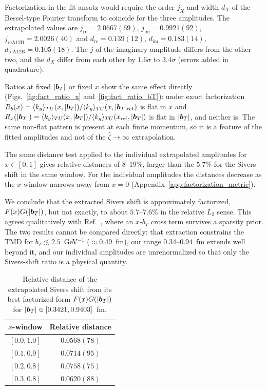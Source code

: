 Factorization in the fit ansatz would require the order $j_X$ and width $d_X$ of the Bessel-type Fourier transform to coincide for the three amplitudes. The extrapolated values are $j_{\text{re}}=2.0667(69)$, $j_{\text{im}}=0.9921(92)$, $j_{\text{reA12B}}=2.0026(40)$ and $d_{\text{re}}=0.139(12)$, $d_{\text{im}}=0.183(14)$, $d_{\text{reA12B}}=0.105(18)$. The $j$ of the imaginary amplitude differs from the other two, and the $d_X$ differ from each other by $1.6\sigma$ to $3.4\sigma$ (errors added in quadrature).

Ratios at fixed $|\boldsymbol{b}_T|$ or fixed $x$ show the same effect directly (Figs.~\ref{fig:fact_ratio_x} and~\ref{fig:fact_ratio_bT}): under exact factorization $R_b(x)=\langle k_y\rangle_{TU}(x,|\boldsymbol{b}_T|)/\langle k_y\rangle_{TU}(x,|\boldsymbol{b}_T|_{\rm ref})$ is flat in $x$ and $R_x(|\boldsymbol{b}_T|)=\langle k_y\rangle_{TU}(x,|\boldsymbol{b}_T|)/\langle k_y\rangle_{TU}(x_{\rm ref},|\boldsymbol{b}_T|)$ is flat in $|\boldsymbol{b}_T|$, and neither is. The same non-flat pattern is present at each finite momentum, so it is a feature of the fitted amplitudes and not of the $\hat\zeta\to\infty$ extrapolation.

The same distance test applied to the individual extrapolated amplitudes for $x\in[0,1]$ gives relative distances of $8$--$19\%$, larger than the $5.7\%$ for the Sivers shift in the same window. For the individual amplitudes the distances decrease as the $x$-window narrows away from $x=0$ (Appendix~\ref{app:factorization_metric}).

We conclude that the extracted Sivers shift is approximately factorized, $F(x)G(|\boldsymbol{b}_T|)$, but not exactly, to about $5.7$--$7.6\%$ in the relative $L_2$ sense. This agrees qualitatively with Ref.~\cite{Granger:2026symb}, where an $x$-$b_T$ cross term survives a sparsity prior. The two results cannot be compared directly: that extraction constrains the TMD for $b_T\lesssim2.5$~GeV$^{-1}$ ($\approx0.49$~fm), our range $0.34$--$0.94$~fm extends well beyond it, and our individual amplitudes are unrenormalized so that only the Sivers-shift ratio is a physical quantity.

\begin{table}
\caption{Relative distance of the extrapolated Sivers shift from its best factorized form $F(x)G(|\boldsymbol{b}_T|)$ for $|\boldsymbol{b}_T|\in[0.3421,0.9403]$~fm.}
\label{tab:fact_sivers}
\begin{ruledtabular}
\begin{tabular}{cc}
$x$-window & Relative distance \\
\hline
$[0.0,1.0]$ & $0.0568(78)$ \\
$[0.1,0.9]$ & $0.0714(95)$ \\
$[0.2,0.8]$ & $0.0758(75)$ \\
$[0.3,0.8]$ & $0.0620(88)$ \\
\end{tabular}
\end{ruledtabular}
\end{table}

